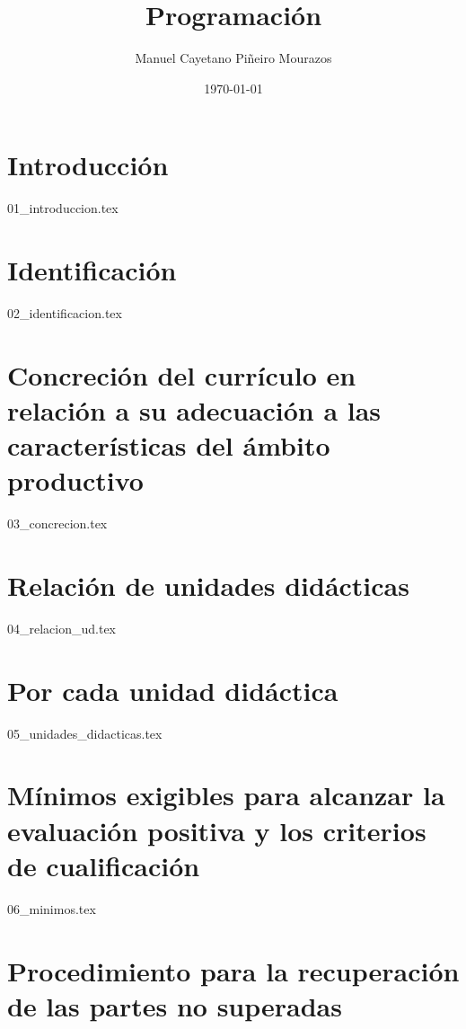 \documentclass[a4paper,oneside,titlepage,12pt]{article}
\title{Programación}
\author{Manuel Cayetano Piñeiro Mourazos}
\date{\today}
\begin{document}
\maketitle

\tableofcontents

\newpage

\section*{Introducción}

{01_introduccion.tex}

\section{Identificación}

{02_identificacion.tex}

\section[Concreción del currículo en relación al ámbito productivo]{Concreción del currículo en relación a su adecuación a las características del ámbito productivo}

{03_concrecion.tex}

\section{Relación de unidades didácticas}

{04_relacion_ud.tex}

\section{Por cada unidad didáctica}

{05_unidades_didacticas.tex}

\section[Mínimos exigibles]{Mínimos exigibles para alcanzar la evaluación positiva y los criterios de cualificación}

{06_minimos.tex}

\section{Procedimiento para la recuperación de las partes no superadas}
\end{document}
